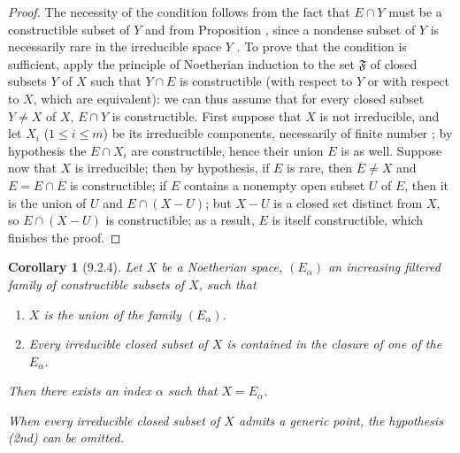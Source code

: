 \documentclass[oneside]{amsart}
\theoremstyle{ega-env-style}
\theoremstyle{ega-thm-env-style}
\newtheorem*{corollary}{Corollary}
\theoremstyle{ega-defn-env-style}
\def\leq{\leqslant}                 %
\def\setmin{-}                      %
\let\EGAOriginalLabel\label
\renewcommand{\label}[1]{\phantomsection\EGAOriginalLabel{#1}}
\begin{document}
\begin{proof}
The necessity of the condition follows from the fact that $E\cap Y$ must be a constructible subset of $Y$ and from Proposition , since a nondense subset of $Y$ is necessarily rare in the irreducible space $Y$ .
To prove that the condition is sufficient, apply the principle of Noetherian induction  to the set $\mathfrak{F}$ of closed subsets $Y$ of $X$ such that $Y\cap E$ is constructible (with respect to $Y$ or with respect to $X$, which are equivalent): we can thus assume that for every closed subset $Y\neq X$ of $X$, $E\cap Y$ is constructible.
First suppose that $X$ is not irreducible, and let $X_i$ ($1\leq i\leq m$) be its irreducible components, necessarily of finite number ; by hypothesis the $E\cap X_i$ are constructible, hence their union $E$ is as well.
Suppose now that $X$ is irreducible; then by hypothesis, if $E$ is rare, then $\overline{E}\neq X$ and $E=E\cap\overline{E}$ is constructible; if $E$ contains a nonempty open subset $U$ of $E$, then it is the union of $U$ and $E\cap(X\setmin U)$; but $X\setmin U$ is a closed set distinct from $X$, so $E\cap(X\setmin U)$ is constructible; as a result, $E$ is itself constructible, which finishes the proof.
\end{proof}

\begin{corollary}[9.2.4]
\label{0.9.2.4}
Let $X$ be a Noetherian space, $(E_\alpha)$ an increasing filtered family of constructible subsets of $X$, such that
\begin{enumerate}
  \item[\emph{(1st)}] $X$ is the union of the family $(E_\alpha)$.
  \item[\emph{(2nd)}] Every irreducible closed subset of $X$ is contained in the closure of one of the $E_\alpha$.
\end{enumerate}

Then there exists an index $\alpha$ such that $X=E_\alpha$.

When every irreducible closed subset of $X$ admits a generic point, the hypothesis \emph{(2nd)} can be omitted.
\end{corollary}
\end{document}

